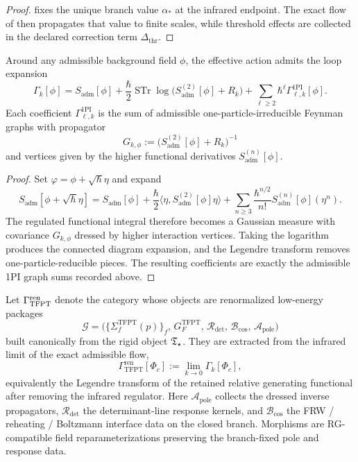 \begin{proof}
 fixes the unique branch value $\alpha_\ast$ at the infrared endpoint.
The exact flow of  then propagates that value to finite scales,
while threshold effects are collected in the declared correction term $\Delta_{\mathrm{thr}}$.
\end{proof}

\begin{theorem}
\label{thm:admissible-1pi-graph-expansion}
Around any admissible background field $\phi$, the effective action admits the loop expansion
\[
\Gamma_k[\phi]
=
S_{\mathrm{adm}}[\phi]
+\frac{\hbar}{2}\operatorname{STr}\log\!\bigl(S_{\mathrm{adm}}^{(2)}[\phi]+R_k\bigr)
+\sum_{\ell\ge 2}\hbar^\ell\Gamma_{\ell,k}^{\mathrm{1PI}}[\phi].
\]
Each coefficient $\Gamma_{\ell,k}^{\mathrm{1PI}}$ is the sum of admissible one-particle-irreducible
Feynman graphs with propagator
\[
G_{k,\phi}:=\bigl(S_{\mathrm{adm}}^{(2)}[\phi]+R_k\bigr)^{-1}
\]
and vertices given by the higher functional derivatives $S_{\mathrm{adm}}^{(n)}[\phi]$.
\end{theorem}

\begin{proof}
Set $\varphi=\phi+\sqrt{\hbar}\eta$ and expand
\[
S_{\mathrm{adm}}[\phi+\sqrt{\hbar}\eta]
=
S_{\mathrm{adm}}[\phi]
+\frac{\hbar}{2}\langle \eta,S_{\mathrm{adm}}^{(2)}[\phi]\eta\rangle
+\sum_{n\ge 3}\frac{\hbar^{n/2}}{n!}S_{\mathrm{adm}}^{(n)}[\phi](\eta^n).
\]
The regulated functional integral therefore becomes a Gaussian measure with covariance
$G_{k,\phi}$ dressed by higher interaction vertices. Taking the logarithm produces the connected
diagram expansion, and the Legendre transform removes one-particle-reducible pieces. The resulting
coefficients are exactly the admissible 1PI graph sums recorded above.
\end{proof}

\begin{definition}
\label{def:renormalized-low-energy-package}
Let $\Gamma_{\mathrm{TFPT}}^{\mathrm{ren}}$ denote the category whose objects are renormalized low-energy packages
\[
\mathcal G=
\bigl(
\{\Sigma_f^{\mathrm{TFPT}}(p)\}_f,\,
G_F^{\mathrm{TFPT}},\,
\mathcal R_{\det},\,
\mathcal B_{\mathrm{cos}},\,
\mathcal A_{\mathrm{pole}}
\bigr)
\]
built canonically from the rigid object $\mathfrak T_{\star}$. They are extracted from the infrared limit of the
exact admissible flow,
\[
\Gamma_{\mathrm{TFPT}}^{\mathrm{ren}}[\Phi_c]
:=
\lim_{k\to0}\Gamma_k[\Phi_c],
\]
equivalently the Legendre transform of the retained relative generating functional after removing
the infrared regulator. Here $\mathcal A_{\mathrm{pole}}$ collects the dressed inverse propagators,
$\mathcal R_{\det}$ the determinant-line response kernels, and $\mathcal B_{\mathrm{cos}}$ the
FRW / reheating / Boltzmann interface data on the closed branch. Morphisms are RG-compatible field
reparameterizations preserving the branch-fixed pole and response data.
\end{definition}

